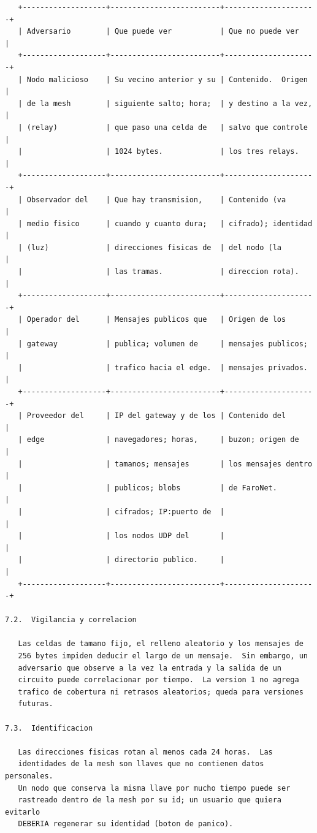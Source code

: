 \begin{Verbatim}
   +-------------------+-------------------------+---------------------+
   | Adversario        | Que puede ver           | Que no puede ver    |
   +-------------------+-------------------------+---------------------+
   | Nodo malicioso    | Su vecino anterior y su | Contenido.  Origen  |
   | de la mesh        | siguiente salto; hora;  | y destino a la vez, |
   | (relay)           | que paso una celda de   | salvo que controle  |
   |                   | 1024 bytes.             | los tres relays.    |
   +-------------------+-------------------------+---------------------+
   | Observador del    | Que hay transmision,    | Contenido (va       |
   | medio fisico      | cuando y cuanto dura;   | cifrado); identidad |
   | (luz)             | direcciones fisicas de  | del nodo (la        |
   |                   | las tramas.             | direccion rota).    |
   +-------------------+-------------------------+---------------------+
   | Operador del      | Mensajes publicos que   | Origen de los       |
   | gateway           | publica; volumen de     | mensajes publicos;  |
   |                   | trafico hacia el edge.  | mensajes privados.  |
   +-------------------+-------------------------+---------------------+
   | Proveedor del     | IP del gateway y de los | Contenido del       |
   | edge              | navegadores; horas,     | buzon; origen de    |
   |                   | tamanos; mensajes       | los mensajes dentro |
   |                   | publicos; blobs         | de FaroNet.         |
   |                   | cifrados; IP:puerto de  |                     |
   |                   | los nodos UDP del       |                     |
   |                   | directorio publico.     |                     |
   +-------------------+-------------------------+---------------------+

7.2.  Vigilancia y correlacion

   Las celdas de tamano fijo, el relleno aleatorio y los mensajes de
   256 bytes impiden deducir el largo de un mensaje.  Sin embargo, un
   adversario que observe a la vez la entrada y la salida de un
   circuito puede correlacionar por tiempo.  La version 1 no agrega
   trafico de cobertura ni retrasos aleatorios; queda para versiones
   futuras.

7.3.  Identificacion

   Las direcciones fisicas rotan al menos cada 24 horas.  Las
   identidades de la mesh son llaves que no contienen datos personales.
   Un nodo que conserva la misma llave por mucho tiempo puede ser
   rastreado dentro de la mesh por su id; un usuario que quiera evitarlo
   DEBERIA regenerar su identidad (boton de panico).


\end{Verbatim}
